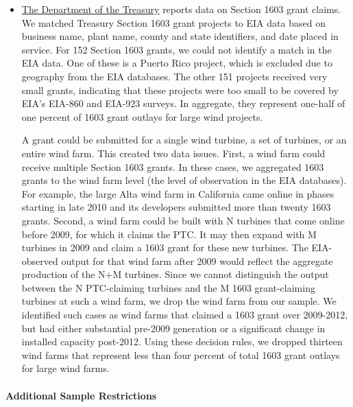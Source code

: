 \documentclass[12pt]{article}
\begin{document}
\begin{itemize}
\item \href{https://www.treasury.gov/initiatives/recovery/Pages/1603.aspx}{The Department of the Treasury} reports data on Section 1603 grant claims. We matched Treasury Section 1603 grant projects to EIA data based on business name, plant name, county and state identifiers, and date placed in service. For 152 Section 1603 grants, we could not identify a match in the EIA data. One of these is a Puerto Rico project, which is excluded due to geography from the EIA databases. The other 151 projects received very small grants, indicating that these projects were too small to be covered by EIA's EIA-860 and EIA-923 surveys. In aggregate, they represent one-half of one percent of 1603 grant outlays for large wind projects. 

A grant could be submitted for a single wind turbine, a set of turbines, or an entire wind farm. This created two data issues. First, a wind farm could receive multiple Section 1603 grants. In these cases, we aggregated 1603 grants to the wind farm level (the level of observation in the EIA databases). For example, the large Alta wind farm in California came online in phases starting in late 2010 and its developers submitted more than twenty 1603 grants. Second, a wind farm could be built with N turbines that come online before 2009, for which it claims the PTC. It may then expand with M turbines in 2009 and claim a 1603 grant for these new turbines. The EIA-observed output for that wind farm after 2009 would reflect the aggregate production of the N+M turbines. Since we cannot distinguish the output between the N PTC-claiming turbines and the M 1603 grant-claiming turbines at such a wind farm, we drop the wind farm from our sample. We identified such cases as wind farms that claimed a 1603 grant over 2009-2012, but had either substantial pre-2009 generation or a significant change in installed capacity post-2012. Using these decision rules, we dropped thirteen wind farms that represent less than four percent of total 1603 grant outlays for large wind farms. 
\end{itemize}

\paragraph*{Additional Sample Restrictions}
\end{document}
